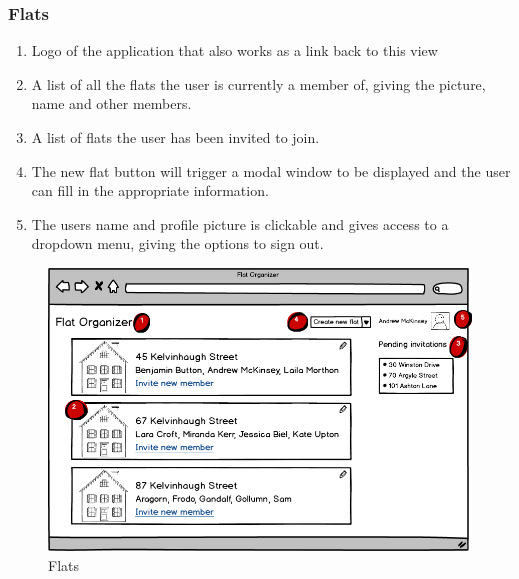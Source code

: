 \documentclass{sig-alt-release2}
\begin{document}
\subsubsection{Flats}

\begin{enumerate}
\item Logo of the application that also works as a link back to this view
\item A list of all the flats the user is currently a member of, giving the picture, name and other members. 
\item A list of flats the user has been invited to join. 
\item The new flat button will trigger a modal window to be displayed and the user can fill in the appropriate information.
\item The users name and profile picture is clickable and gives access to a dropdown menu, giving the options to sign out.
\end{enumerate}

\begin{figure}[!ht]
\centering
\includegraphics[scale=0.25]{flats}
\caption{Flats}
\label{fig:flats}
\end{figure}
\end{document}
